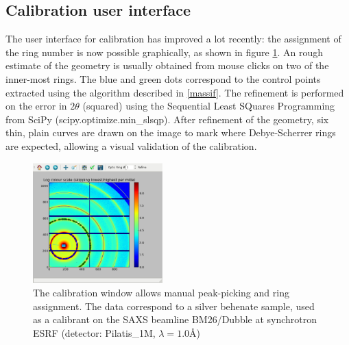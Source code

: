 \documentclass[preprint]{iucr}
\begin{document}
\subsection{Calibration user interface}

The user interface for calibration has improved a lot recently: the assignment
of the ring number is now possible graphically, as shown in figure \ref{calib}.
An rough estimate of the geometry is usually obtained from mouse clicks on 
two of the inner-most rings. 
The blue and green dots correspond to the control points extracted using the
algorithm described in \ref{massif}.
The refinement is performed on the error in $2\theta$ (squared) using the 
Sequential Least SQuares Programming  from
SciPy (scipy.optimize.min_slsqp).
After refinement of the geometry, six thin, plain curves are drawn on the image
to mark where Debye-Scherrer rings are expected, allowing a visual validation of
the calibration. 

\begin{figure}
\label{calib}
\begin{center}
\includegraphics[width=5cm]{calib.eps}
\caption{The calibration window allows manual peak-picking and
ring assignment. The data correspond to a silver behenate sample, used as a
calibrant on the SAXS beamline BM26/Dubble at synchrotron ESRF (detector:
Pilatis_1M, $\lambda=1.0${\AA})}
\end{center}
\end{figure}
\end{document}
